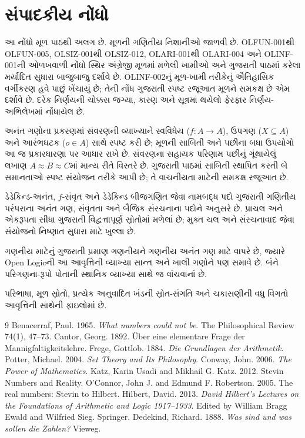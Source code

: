 \section*{સંપાદકીય નોંધો}
આ નોંધો મૂળ પાઠથી અલગ છે. મૂળની ગણિતીય નિશાનીઓ જાળવી છે.
OLFUN-001થી OLFUN-005, OLSIZ-001થી OLSIZ-012, OLARI-001થી
OLARI-004 અને OLINF-001ની ઓળખવાળી નોંધો સ્થિર અંગ્રેજી મૂળમાં
મળેલી ખામીઓ અને ગુજરાતી પાઠમાં કરેલા મર્યાદિત સુધારા બાજુબાજુ
દર્શાવે છે. OLINF-002નું મૂળ-ખામી તરીકેનું ઐતિહાસિક વર્ગીકરણ હવે
પાછું ખેંચાયું છે; તેની નોંધ ગુજરાતી સ્પષ્ટ રજૂઆત મૂળને સમકક્ષ છે
એમ દર્શાવે છે. દરેક નિર્ણયની ચોક્કસ જગ્યા, કારણ અને સૂત્રમાં થયેલો
ફેરફાર નિર્ણય-અભિલેખમાં નોંધાયેલ છે.

અનંત ગણોના પ્રકરણમાં સંવરણની વ્યાખ્યાને સ્વવિધેય ($f\colon A\to A$),
ઉપગણ ($X\subseteq A$) અને આરંભઘટક ($o\in A$) સાથે સ્પષ્ટ કરી છે;
મૂળની સાબિતી અને પછીના બધા ઉપયોગો આ જ પ્રકારધારણા પર આધાર રાખે છે.
સંવરણના સહાયક પરિણામ પછીનું ગૂંથાયેલું \texttt{\string\cardeq}
લખાણ $A\approx B\approx C$માં માન્ય રીતે વિસ્તરે છે. ગુજરાતી પાઠમાં
સાબિતી સ્થાપિત કરતી બે સમાનતાઓ સ્પષ્ટ સંયોજન તરીકે આપી છે; તે
વાચનીયતા માટેની સમકક્ષ રજૂઆત છે.

ડેડેકિન્ડ-અનંત, $f$-સંવૃત અને ડેડેકિન્ડ બીજગણિત જેવા નામબદ્ધ
પદો ગુજરાતી ગણિતીય પરંપરાના અનંત ગણ, સંવૃતતા અને બૈજિક સંરચનાના
પદોને અનુસરે છે. પ્રાચલ અને એકરૂપતા સીધા ગુજરાતી વિદ્વત્તાપૂર્ણ
સ્રોતોમાં મળેલાં છે; મુક્ત ચલ અને સંરચનાવાદ જેવા સંયોજનો નિષ્ણાત
સુધારા માટે ખુલ્લા છે.

ગણનીય માટેનું ગુજરાતી પ્રમાણ ગણનીયને ગણનીય અનંત ગણ માટે વાપરે છે,
જ્યારે Open Logicની આ આવૃત્તિની વ્યાખ્યા સાન્ત અને ખાલી ગણોને પણ
સમાવે છે. બંને પરિગણના-રૂપો પોતાની સ્થાનિક વ્યાખ્યા સાથે જ વાંચવાનાં છે.

પરિભાષા, મૂળ સ્રોતો, પ્રત્યેક અનુવાદિત ખંડની સ્રોત-સંગતિ અને
ચકાસણીની વધુ વિગતો આવૃત્તિની સાથેની ફાઇલોમાં છે.
\begin{thebibliography}{9}
Benacerraf, Paul. 1965. \emph{What numbers could not be}.
The Philosophical Review 74(1), 47--73.
Cantor, Georg. 1892. Über eine elementare Frage der Mannigfaltigkeitslehre.
Frege, Gottlob. 1884. \emph{Die Grundlagen der Arithmetik}.
Potter, Michael. 2004. \emph{Set Theory and Its Philosophy}.
Conway, John. 2006. \emph{The Power of Mathematics}.
Katz, Karin Usadi and Mikhail G. Katz. 2012. Stevin Numbers and Reality.
O'Connor, John J. and Edmund F. Robertson. 2005. The real numbers: Stevin to Hilbert.
Hilbert, David. 2013. \emph{David Hilbert's Lectures on the Foundations of Arithmetic and Logic 1917--1933}.
Edited by William Bragg Ewald and Wilfried Sieg. Springer.
Dedekind, Richard. 1888. \emph{Was sind und was sollen die Zahlen?} Vieweg.
\end{thebibliography}

